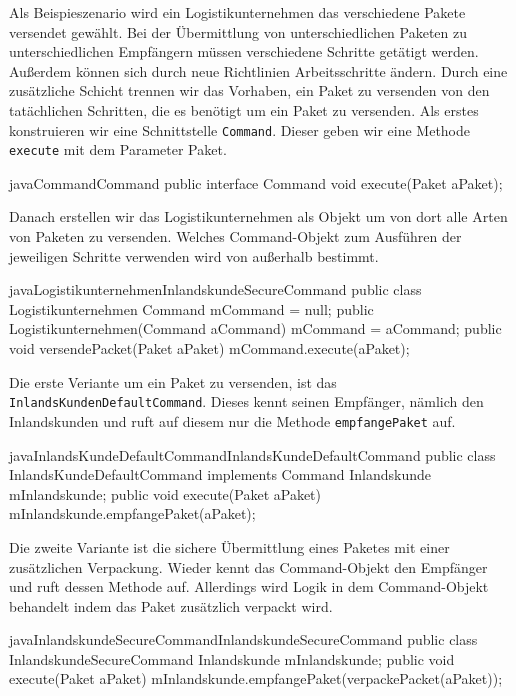 Als  Beispieszenario wird  ein Logistikunternehmen das verschiedene Pakete versendet gewählt. Bei der Übermittlung von unterschiedlichen Paketen zu unterschiedlichen Empfängern müssen verschiedene Schritte getätigt werden. Außerdem können sich durch neue Richtlinien Arbeitsschritte ändern. 
Durch eine zusätzliche Schicht trennen wir das Vorhaben, ein Paket zu versenden von den tatächlichen Schritten, die es benötigt um ein Paket zu versenden. 
Als erstes konstruieren wir eine Schnittstelle \texttt{Command}. Dieser geben wir eine Methode \texttt{execute} mit dem Parameter Paket. 

\begin{beispiel}{java}{Command}{Command}
public interface Command {
    void execute(Paket aPaket);
}
\end{beispiel}

Danach erstellen wir das Logistikunternehmen als Objekt um von dort alle Arten von Paketen zu versenden. Welches Command-Objekt zum Ausführen der jeweiligen Schritte verwenden wird von außerhalb bestimmt.

\begin{beispiel}{java}{Logistikunternehmen}{InlandskundeSecureCommand}
public class Logistikunternehmen {
    Command mCommand = null;
    public Logistikunternehmen(Command aCommand){
        mCommand = aCommand;
    }
    public void versendePacket(Paket aPaket){
        mCommand.execute(aPaket);
    }
}
\end{beispiel}

Die erste Veriante um ein Paket zu versenden, ist das \texttt{InlandsKundenDefaultCommand}. Dieses kennt seinen Empfänger, nämlich den Inlandskunden und ruft auf diesem nur die Methode \texttt{empfangePaket} auf.

\begin{beispiel}{java}{InlandsKundeDefaultCommand}{InlandsKundeDefaultCommand}
public class InlandsKundeDefaultCommand implements Command{
    Inlandskunde mInlandskunde;
    public void execute(Paket aPaket) {
        mInlandskunde.empfangePaket(aPaket);
    }
}
\end{beispiel}

Die zweite Variante ist die sichere Übermittlung eines Paketes mit einer zusätzlichen Verpackung. Wieder kennt das Command-Objekt den Empfänger und ruft dessen Methode auf. Allerdings wird Logik in dem Command-Objekt behandelt indem das Paket zusätzlich verpackt wird.

\begin{beispiel}{java}{InlandskundeSecureCommand}{InlandskundeSecureCommand}
public class InlandskundeSecureCommand {
    Inlandskunde mInlandskunde;
    public void execute(Paket aPaket) {
        mInlandskunde.empfangePaket(verpackePacket(aPaket));
    }
}
\end{beispiel}

